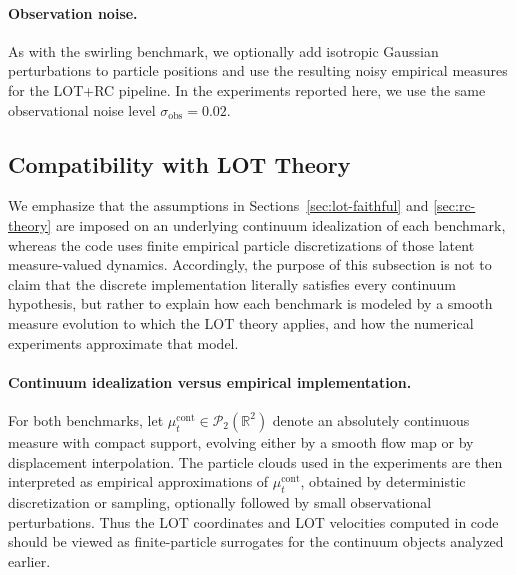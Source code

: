 \documentclass[11pt]{article}
\newcommand{\R}{\mathbb{R}}
\newcommand{\1}{\mathbf{1}}
\begin{document}
\paragraph{Observation noise.}
As with the swirling benchmark, we optionally add isotropic Gaussian perturbations to particle positions and use the resulting noisy empirical measures for the LOT+RC pipeline. In the experiments reported here, we use the same observational noise level \(\sigma_{\text{obs}}=0.02\).

\subsection{Compatibility with LOT Theory}\label{sec:verify-compat}

We emphasize that the assumptions in Sections~\ref{sec:lot-faithful} and \ref{sec:rc-theory} are imposed on an underlying continuum idealization of each benchmark, whereas the code uses finite empirical particle discretizations of those latent measure-valued dynamics. Accordingly, the purpose of this subsection is not to claim that the discrete implementation literally satisfies every continuum hypothesis, but rather to explain how each benchmark is modeled by a smooth measure evolution to which the LOT theory applies, and how the numerical experiments approximate that model.

\paragraph{Continuum idealization versus empirical implementation.}
For both benchmarks, let \(\mu_t^{\mathrm{cont}}\in\mathcal P_2(\R^2)\) denote an absolutely continuous measure with compact support, evolving either by a smooth flow map or by displacement interpolation. The particle clouds used in the experiments are then interpreted as empirical approximations of \(\mu_t^{\mathrm{cont}}\), obtained by deterministic discretization or sampling, optionally followed by small observational perturbations. Thus the LOT coordinates and LOT velocities computed in code should be viewed as finite-particle surrogates for the continuum objects analyzed earlier.
\end{document}
